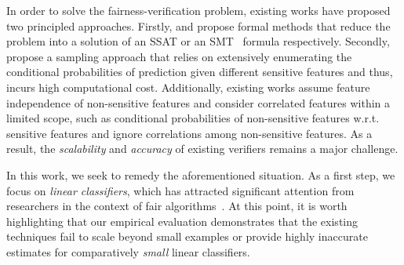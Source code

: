  	
	
	In order to solve the fairness-verification problem, existing works have proposed two principled approaches.	Firstly, \cite{ghosh2020justicia} and \cite{albarghouthi2017fairsquare} propose formal methods that reduce the problem into a solution of an SSAT or an SMT~ formula respectively.	Secondly, \cite{bastani2019probabilistic} propose a sampling approach that relies on extensively enumerating the conditional probabilities of prediction given different sensitive features and thus, incurs high computational cost. Additionally, existing works assume feature independence of non-sensitive features and consider correlated features within a limited scope, such as conditional probabilities of non-sensitive features w.r.t. sensitive features and ignore correlations among non-sensitive features. As a result, the \textit{scalability} and \textit{accuracy} of existing  verifiers remains a major challenge.
	
	In this work, we seek to remedy the aforementioned situation. As a first step, we focus on  \textit{linear classifiers}, which has attracted significant attention from researchers in the context of fair algorithms~\cite{pleiss2017fairness,zafar2017fairness,dressel2018accuracy, john2020verifying}. At this point, it is worth highlighting that our empirical evaluation demonstrates that the existing techniques fail to scale beyond small examples or provide highly inaccurate estimates for comparatively {\em small} linear classifiers. 
	
	
